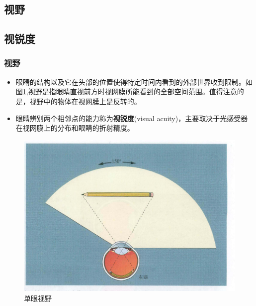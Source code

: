 \subsection{视野}
\subsection{视锐度}
\begin{frame}
    \frametitle{视野}
    \begin{itemize}
        \item 眼睛的结构以及它在头部的位置使得特定时间内看到的外部世界收到限制。如图\ref{pic3-3},视野是指眼睛直视前方时视网膜所能看到的全部空间范围。值得注意的是，视野中的物体在视网膜上是反转的。
        \item 眼睛辨别两个相邻点的能力称为\textbf{视锐度}(visual acuity)，主要取决于光感受器在视网膜上的分布和眼睛的折射精度。
    \end{itemize}

    \begin{figure}
        \centering
        \includegraphics[height=0.3\textwidth]{img/pic3-3.png}
        \caption{单眼视野\label{pic3-3}}
    \end{figure}
\end{frame}
